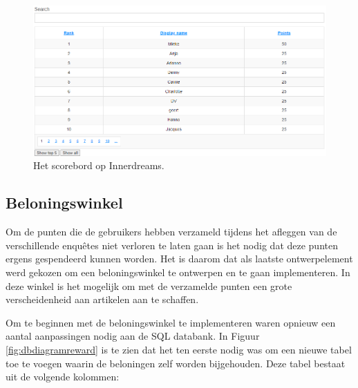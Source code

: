 \begin{figure}
    \includegraphics[width=\linewidth]{LeaderboardInnerdreams.png}
    \caption{Het scorebord op Innerdreams.}
    \label{fig:leaderboardinnerdreams}
\end{figure}

\subsection{Beloningswinkel}

Om de punten die de gebruikers hebben verzameld tijdens het afleggen van de verschillende enquêtes niet verloren te laten gaan is het nodig dat deze punten ergens gespendeerd kunnen worden. Het is daarom dat als laatste ontwerpelement werd gekozen om een beloningswinkel te ontwerpen en te gaan implementeren. In deze winkel is het mogelijk om met de verzamelde punten een grote verscheidenheid aan artikelen aan te schaffen.

Om te beginnen met de beloningswinkel te implementeren waren opnieuw een aantal aanpassingen nodig aan de SQL databank. In Figuur \ref{fig:dbdiagramreward} is te zien dat het ten eerste nodig was om een nieuwe tabel toe te voegen waarin de beloningen zelf worden bijgehouden. Deze tabel bestaat uit de volgende kolommen:

